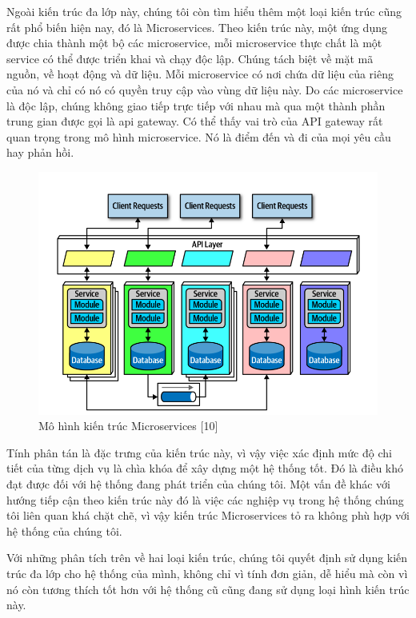 \par
Ngoài kiến trúc đa lớp này, chúng tôi còn tìm hiểu thêm một loại kiến trúc cũng
rất phổ biến hiện nay, đó là Microservices. Theo kiến trúc này, một ứng dụng
được chia thành một bộ các microservice, mỗi microservice thực chất là một
service có thể được triển khai và chạy độc lập. Chúng tách biệt về mặt mã
nguồn, về hoạt động và dữ liệu. Mỗi microservice có nơi chứa dữ liệu của riêng
của nó và chỉ có nó có quyền truy cập vào vùng dữ liệu này. Do các microservice
là độc lập, chúng không giao tiếp trực tiếp với nhau mà qua một thành phần
trung gian được gọi là \acrshort*{api} gateway. Có thể thấy vai trò của API gateway rất
quan trọng trong mô hình microservice. Nó là điểm đến và đi của mọi yêu cầu hay
phản hồi.
\begin{figure}[H]
      \centering
      \includegraphics[width=\linewidth]{Content/Phân tích và thiết kế hệ thống/documents/Kiến trúc hệ thống/images/microservice.png}
      \vspace{0.5cm}
      \caption{Mô hình kiến trúc Microservices [10]}
      \label{fig:Mô hình kiến trúc Microservices}
\end{figure}
\par
Tính phân tán là đặc trưng của kiến trúc này, vì vậy việc xác định mức độ chi
tiết của từng dịch vụ là chìa khóa để xây dựng một hệ thống tốt. Đó là điều khó
đạt được đối với hệ thống đang phát triển của chúng tôi. Một vấn đề khác với
hướng tiếp cận theo kiến trúc này đó là việc các nghiệp vụ trong hệ thống chúng
tôi liên quan khá chặt chẽ, vì vậy kiến trúc Microservices tỏ ra không phù hợp
với hệ thống của chúng tôi.
\par
Với những phân tích trên về hai loại kiến trúc, chúng tôi quyết định sử dụng kiến
trúc đa lớp cho hệ thống của mình, không chỉ vì tính đơn giản, dễ hiểu mà còn vì
nó còn tương thích tốt hơn với hệ thống cũ cũng đang sử dụng loại hình kiến trúc này.